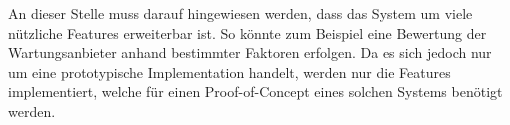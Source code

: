 An dieser Stelle muss darauf hingewiesen werden, dass das System um viele nützliche Features erweiterbar ist. So könnte zum Beispiel eine Bewertung der Wartungsanbieter anhand bestimmter Faktoren erfolgen. Da es sich jedoch nur um eine prototypische Implementation handelt, werden nur die Features implementiert, welche für einen Proof-of-Concept eines solchen Systems benötigt werden.


